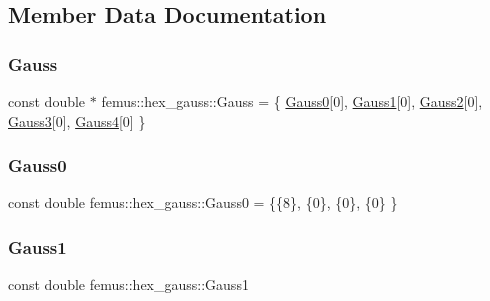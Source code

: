 \subsection{Member Data Documentation}
\mbox{\label{classfemus_1_1hex__gauss_a9bc16b5fd5ef1ac4cbe74704098055c2}} 
\subsubsection{\texorpdfstring{Gauss}{Gauss}}
{\footnotesize\ttfamily const double $\ast$ femus\+::hex\+\_\+gauss\+::\+Gauss = \{ \mbox{\hyperlink{classfemus_1_1hex__gauss_a3b4d247df74c3bd78282af5723c9a823}{Gauss0}}\mbox{[}0\mbox{]}, \mbox{\hyperlink{classfemus_1_1hex__gauss_add0c4c359244c52778f61ba3c250a361}{Gauss1}}\mbox{[}0\mbox{]}, \mbox{\hyperlink{classfemus_1_1hex__gauss_a9cb855ddaa9d2e95bebc34f0220abb4f}{Gauss2}}\mbox{[}0\mbox{]}, \mbox{\hyperlink{classfemus_1_1hex__gauss_a7b371e3076b486fc863ebf418cc75fec}{Gauss3}}\mbox{[}0\mbox{]}, \mbox{\hyperlink{classfemus_1_1hex__gauss_a831f1eea9fa85e31d69ca29de52f22c8}{Gauss4}}\mbox{[}0\mbox{]} \}\hspace{0.3cm}{\ttfamily [static]}}

\mbox{\label{classfemus_1_1hex__gauss_a3b4d247df74c3bd78282af5723c9a823}} 
\subsubsection{\texorpdfstring{Gauss0}{Gauss0}}
{\footnotesize\ttfamily const double femus\+::hex\+\_\+gauss\+::\+Gauss0 = \{\{8\}, \{0\}, \{0\}, \{0\} \}\hspace{0.3cm}{\ttfamily [static]}}

\mbox{\label{classfemus_1_1hex__gauss_add0c4c359244c52778f61ba3c250a361}} 
\subsubsection{\texorpdfstring{Gauss1}{Gauss1}}
{\footnotesize\ttfamily const double femus\+::hex\+\_\+gauss\+::\+Gauss1\hspace{0.3cm}{\ttfamily [static]}}

